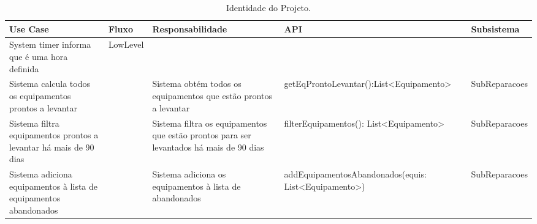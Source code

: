 \documentclass[../relatorio.tex]{subfiles}
\begin{document}
\begin{landscape}
    \begin{table}[!h]
        \centering
        \begin{tabular}{|p{5cm}|p{1cm}|p{4cm}|p{6cm}|p{3cm}|}
            \hline
            \rowcolor{gray!20!white}
            Use Case & Fluxo & Responsabilidade & API & Subsistema \\
            \hline
            \rowcolor{red}
            System timer informa que é uma hora definida
                     & LowLevel
                     &
                     &
                     &
            \\
            \hline
            Sistema calcula todos os equipamentos prontos a levantar 
                     & 
                     & Sistema obtém todos os equipamentos que estão prontos a levantar
                     & getEqProntoLevantar():List<Equipamento>
                     & SubReparacoes
            \\
            \hline
            Sistema filtra equipamentos prontos a levantar há mais de 90 dias
                     &
                     & Sistema filtra os equipamentos que estão prontos para ser levantados há mais de 90 dias
                     & filterEquipamentos(): List<Equipamento>
                     & SubReparacoes
            \\
            \hline
            Sistema adiciona equipamentos à lista de equipamentos abandonados
                     & 
                     & Sistema adiciona os equipamentos à lista de abandonados
                     & addEquipamentosAbandonados(equis: List<Equipamento>)
                     & SubReparacoes
            \\
            \hline
        \end{tabular}
        \caption{Identidade do Projeto.}
    \end{table}
\end{landscape}
\end{document}
